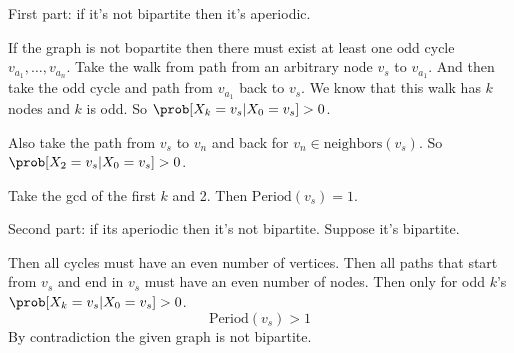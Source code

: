 First part: if it's not bipartite then it's aperiodic.

\noindent If the graph is not bopartite then there must exist at least one odd cycle $v_{a_1}, \dots, v_{a_n}$. Take the walk from 
path from an arbitrary node $v_s$ to $v_{a_1}$. And then take the odd cycle and path from $v_{a_1}$ back to $v_s$. We know that 
this walk has $k$ nodes and $k$ is odd. So $\prob[X_k = v_s | X_0 = v_s] > 0$.

\noindent Also take the path from $v_s$ to $v_n$ and back for $v_n\in\text{neighbors}(v_s)$. So $\prob[X_2 = v_s| X_0 = v_s] > 0$. 

\noindent Take the gcd of the first $k$ and 2. Then $\text{Period}(v_s) = 1$.

\noindent Second part: if its aperiodic then it's not bipartite. Suppose it's bipartite.

\noindent Then all cycles must have an even number of vertices. Then all paths that start from $v_s$ and end in $v_s$ must have an even number of nodes. 
Then only for odd $k$'s $\prob[X_k = v_s|X_0 = v_s] > 0$.
$$
\text{Period}(v_s) > 1 
$$
By contradiction the given graph is not bipartite.
